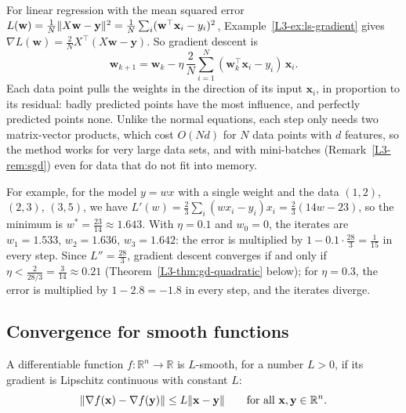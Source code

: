 \begin{example}\label{L3-ex:gd-mse}
    For linear regression with the mean squared error $L(\mathbf{w}) = \frac{1}{N}\lVert X\mathbf{w} - \mathbf{y} \rVert^2 = \frac{1}{N}\sum_i (\mathbf{w}^\top\mathbf{x}_i - y_i)^2$, Example~\ref{L3-ex:ls-gradient} gives $\nabla L(\mathbf{w}) = \frac{2}{N}X^\top(X\mathbf{w} - \mathbf{y})$. So gradient descent is
    \[\mathbf{w}_{k+1} = \mathbf{w}_k - \eta\,\frac{2}{N}\sum_{i=1}^N (\mathbf{w}_k^\top\mathbf{x}_i - y_i)\,\mathbf{x}_i.\]
    Each data point pulls the weights in the direction of its input $\mathbf{x}_i$, in proportion to its residual: badly predicted points have the most influence, and perfectly predicted points none. Unlike the normal equations, each step only needs two matrix-vector products, which cost $O(Nd)$ for $N$ data points with $d$ features, so the method works for very large data sets, and with mini-batches (Remark~\ref{L3-rem:sgd}) even for data that do not fit into memory.

    For example, for the model $y = wx$ with a single weight and the data $(1, 2)$, $(2, 3)$, $(3, 5)$, we have $L'(w) = \frac{2}{3}\sum_i (wx_i - y_i)x_i = \frac{2}{3}(14w - 23)$, so the minimum is $w^* = \frac{23}{14} \approx 1.643$. With $\eta = 0.1$ and $w_0 = 0$, the iterates are $w_1 = 1.533$, $w_2 = 1.636$, $w_3 = 1.642$: the error is multiplied by $1 - 0.1 \cdot \frac{28}{3} = \frac{1}{15}$ in every step. Since $L'' = \frac{28}{3}$, gradient descent converges if and only if $\eta < \frac{2}{28/3} = \frac{3}{14} \approx 0.21$ (Theorem~\ref{L3-thm:gd-quadratic} below); for $\eta = 0.3$, the error is multiplied by $1 - 2.8 = -1.8$ in every step, and the iterates diverge.
\end{example}

\subsection{Convergence for smooth functions}

\begin{definition}
    A differentiable function $f: \mathbb{R}^n \to \mathbb{R}$ is $L$-smooth, for a number $L > 0$, if its gradient is Lipschitz continuous with constant $L$:
    \[\lVert \nabla f(\mathbf{x}) - \nabla f(\mathbf{y}) \rVert \leq L\lVert \mathbf{x} - \mathbf{y} \rVert \qquad \text{for all } \mathbf{x}, \mathbf{y} \in \mathbb{R}^n.\]
\end{definition}

